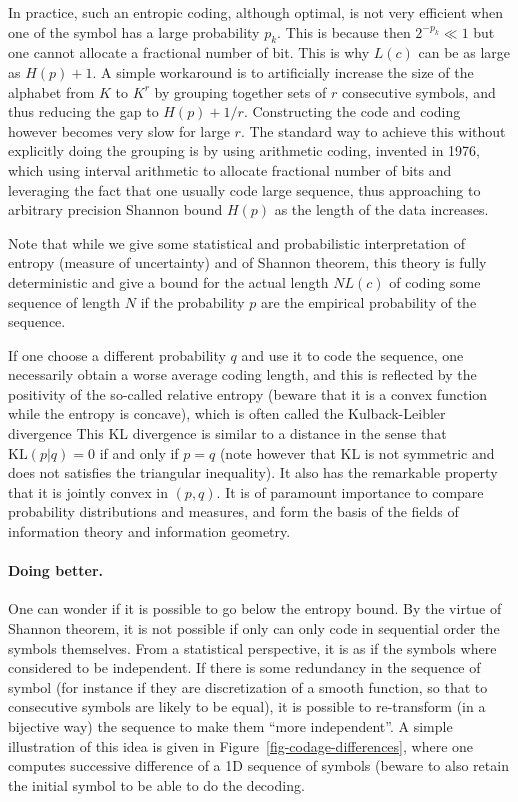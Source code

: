 In practice, such an entropic coding, although optimal, is not very efficient when one of the symbol has a large probability $p_k$. This is because then $2^{-p_k} \ll 1$ but one cannot allocate a fractional number of bit. This is why $L(c)$ can be as large as $H(p)+1$. A simple workaround is to artificially increase the size of the alphabet from $K$ to $K^r$ by grouping together sets of $r$ consecutive symbols, and thus reducing the gap to $H(p)+1/r$. Constructing the code and coding however becomes very slow for large $r$. The standard way to achieve this without explicitly doing the grouping is by using arithmetic coding, invented in 1976, which using interval arithmetic to allocate fractional number of bits and leveraging the fact that one usually code large sequence, thus approaching to arbitrary precision Shannon bound $H(p)$ as the length of the data increases.



Note that while we give some statistical and probabilistic interpretation of entropy (measure of uncertainty) and of Shannon theorem, this theory is fully deterministic and give a bound for the actual length $N L(c)$ of coding some sequence of length $N$ if the probability $p$ are the empirical probability of the sequence.

If one choose a different probability $q$ and use it to code the sequence, one necessarily obtain a worse average coding length, and this is reflected by the positivity of the so-called relative entropy (beware that it is a convex function while the entropy is concave), which is often called the Kulback-Leibler divergence
This KL divergence is similar to a distance in the sense that $\text{KL}(p|q)=0$ if and only if $p=q$ (note however that KL is not symmetric and does not satisfies the triangular inequality). It also has the remarkable property that it is jointly convex in $(p,q)$. It is of paramount importance to compare probability distributions and measures, and form the basis of the fields of information theory and information geometry. 


\paragraph{Doing better.}

One can wonder if it is possible to go below the entropy bound. By the virtue of Shannon theorem, it is not possible if only can only code in sequential order the symbols themselves. From a statistical perspective, it is as if the symbols where considered to be independent. If there is some redundancy in the sequence of symbol (for instance if they are discretization of a smooth function, so that to consecutive symbols are likely to be equal), it is possible to re-transform (in a bijective way) the sequence to make them ``more independent''. A simple illustration of this idea is given in Figure~\ref{fig-codage-differences}, where one computes successive difference of a 1D sequence of symbols (beware to also retain the initial symbol to be able to do the decoding.

